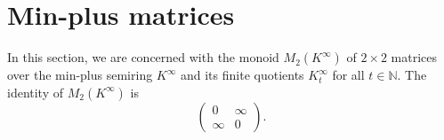 \documentclass{amsart}
\newcommand{\N}{\mathbb{N}}
\numberwithin{equation}{section}
\theoremstyle{definition}
\begin{document}

\section{Min-plus matrices}

In this section, we are concerned with the monoid $M_2(K^{\infty})$ of $2\times
2$ matrices over the min-plus semiring $K^{\infty}$ and its finite quotients
$K^{\infty}_t$ for all $t\in \N$. 
The identity of $M_2(K^{\infty})$ is 
\begin{equation*}
  \begin{pmatrix}
    0      & \infty \\
    \infty & 0      
  \end{pmatrix}.
\end{equation*}
\end{document}
